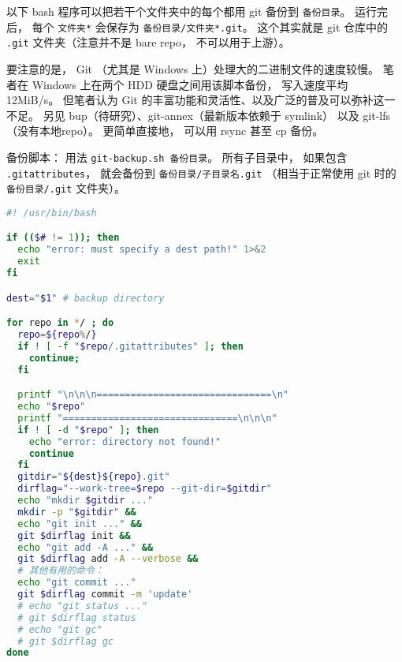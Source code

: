 
\begin{issues}
\issueDraft
\end{issues}


以下 bash 程序可以把若干个文件夹中的每个都用 git 备份到 \verb|备份目录|。 运行完后， 每个 \verb|文件夹*| 会保存为 \verb|备份目录/文件夹*.git|。 这个其实就是 git 仓库中的 \verb|.git| 文件夹（注意并不是 bare repo， 不可以用于上游）。

要注意的是， Git （尤其是 Windows 上）处理大的二进制文件的速度较慢。 笔者在 Windows 上在两个 HDD 硬盘之间用该脚本备份， 写入速度平均 12MiB/s。 但笔者认为 Git 的丰富功能和灵活性、以及广泛的普及可以弥补这一不足。 另见 bup（待研究）、git-annex（最新版本依赖于 symlink） 以及 git-lfs（没有本地repo）。 更简单直接地， 可以用 rsync 甚至 cp 备份。

备份脚本： 用法 \verb|git-backup.sh 备份目录|。 所有子目录中， 如果包含 \verb|.gitattributes|， 就会备份到 \verb|备份目录/子目录名.git| （相当于正常使用 git 时的 \verb|备份目录/.git| 文件夹）。
\begin{lstlisting}[language=bash, caption=git-backup.sh]
#! /usr/bin/bash

if (($# != 1)); then
  echo "error: must specify a dest path!" 1>&2
  exit
fi

dest="$1" # backup directory

for repo in */ ; do
  repo=${repo%/}
  if ! [ -f "$repo/.gitattributes" ]; then
    continue;
  fi

  printf "\n\n\n===============================\n"
  echo "$repo"
  printf "===============================\n\n\n"
  if ! [ -d "$repo" ]; then
    echo "error: directory not found!"
    continue
  fi
  gitdir="${dest}${repo}.git"
  dirflag="--work-tree=$repo --git-dir=$gitdir"
  echo "mkdir $gitdir ..."
  mkdir -p "$gitdir" &&
  echo "git init ..." &&
  git $dirflag init &&
  echo "git add -A ..." &&
  git $dirflag add -A --verbose &&
  # 其他有用的命令：
  echo "git commit ..."
  git $dirflag commit -m 'update'
  # echo "git status ..."
  # git $dirflag status
  # echo "git gc"
  # git $dirflag gc
done
\end{lstlisting}

